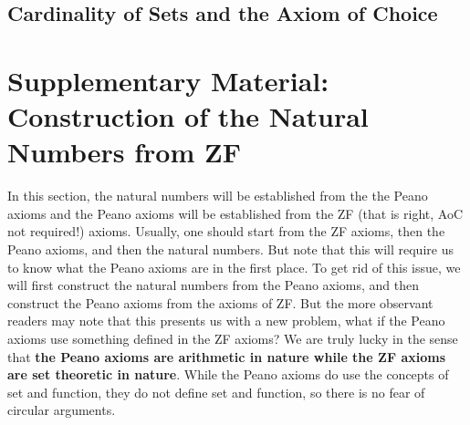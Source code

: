 \subsection{Cardinality of Sets and the Axiom of Choice}
\section{Supplementary Material: Construction of the Natural Numbers from ZF}
In this section, the natural numbers will be established from the the Peano axioms and the Peano axioms will be established from the ZF (that is right, AoC not required!) axioms. Usually, one should start from the ZF axioms, then the Peano axioms, and then the natural numbers. But note that this will require us to know what the Peano axioms are in the first place. To get rid of this issue, we will first construct the natural numbers from the Peano axioms, and then construct the Peano axioms from the axioms of ZF. But the more observant readers may note that this presents us with a new problem, what if the Peano axioms use something defined in the ZF axioms? We are truly lucky in the sense that \textbf{the Peano axioms are arithmetic in nature while the ZF axioms are set theoretic in nature}. While the Peano axioms do use the concepts of set and function, they do not define set and function, so there is no fear of circular arguments.

